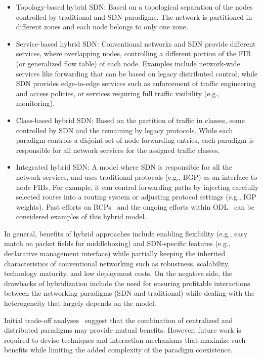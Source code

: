 \begin{itemize}
\item Topology-based hybrid SDN: Based on a topological separation of the nodes controlled by traditional and SDN 
paradigms. The network is partitioned in different zones and each node belongs to only one zone. 
\item Service-based hybrid SDN: Conventional networks and SDN provide different services, where overlapping nodes, 
controlling a different portion of the FIB (or generalized flow table) of each node. Examples include network-wide 
services like forwarding  that can be based on legacy distributed control, while SDN provides edge-to-edge services 
such as enforcement of traffic engineering and access policies, or services requiring full traffic visibility 
(e.g., monitoring).
\item Class-based hybrid SDN: Based on the partition of traffic in classes, some controlled by SDN and the remaining 
by legacy protocols. While each paradigm controls a disjoint set of node forwarding entries,  each paradigm is 
responsible for all network services for the assigned traffic classes. 
\item Integrated hybrid SDN: A model where SDN is responsible for all the network services, and
uses traditional protocols (e.g., BGP) as an interface to node FIBs. For example, it can control forwarding
paths by injecting carefully selected routes into a routing system or adjusting protocol settings (e.g., IGP weights). 
Past efforts on RCPs~\cite{caesar2005} and the ongoing efforts within ODL~\cite{opendaylight2013} can be considered 
examples of this hybrid model.
\end{itemize}

In general, benefits of hybrid approaches include enabling flexibility (e.g., easy match on packet fields for 
middleboxing) and SDN-specific features (e.g., declarative management interface) while partially keeping the inherited 
characteristics of conventional networking such as robustness, scalability, technology maturity, and low deployment 
costs. On the negative side, the drawbacks of hybridization include the need for ensuring profitable interactions 
between the networking paradigms (SDN and traditional) while dealing with the heterogeneity that largely depends on 
the model.

Initial trade-off analyses~\cite{vissicchio2014} suggest that the combination of centralized and distributed paradigms may provide 
mutual benefits. However, future work is required to devise techniques and interaction mechanisms that maximize 
such benefits while limiting the added complexity of the paradigm coexistence.


